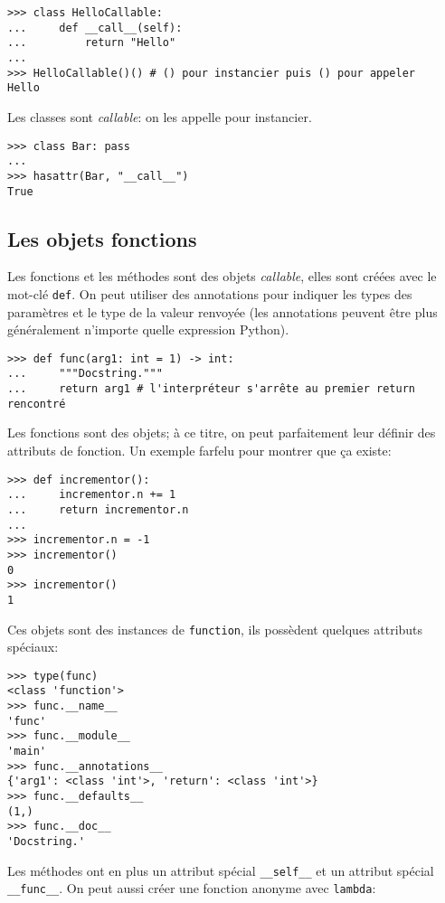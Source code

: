 \begin{verbatim}
>>> class HelloCallable:
...     def __call__(self):
...         return "Hello"
...
>>> HelloCallable()() # () pour instancier puis () pour appeler
Hello
\end{verbatim}


Les classes sont \emph{callable}: on les appelle pour instancier.
\begin{verbatim}
>>> class Bar: pass
...
>>> hasattr(Bar, "__call__")
True
\end{verbatim}

\subsection{Les objets fonctions}

Les fonctions et les méthodes sont des objets \textit{callable}, elles sont créées avec le mot-clé \texttt{def}. On peut utiliser des annotations pour indiquer les types des paramètres et le type de la valeur renvoyée (les annotations peuvent être plus généralement n'importe quelle expression Python).

\begin{verbatim}
>>> def func(arg1: int = 1) -> int:
...     """Docstring."""
...     return arg1 # l'interpréteur s'arrête au premier return rencontré
\end{verbatim}

Les fonctions sont des objets; à ce titre, on peut parfaitement leur définir des attributs de fonction. Un exemple farfelu
pour montrer que ça existe:

\begin{verbatim}
>>> def incrementor():
...     incrementor.n += 1
...     return incrementor.n
...
>>> incrementor.n = -1
>>> incrementor()
0
>>> incrementor()
1
\end{verbatim}

Ces objets sont des instances de \texttt{function}, ils possèdent quelques attributs spéciaux:

\begin{verbatim}
>>> type(func)
<class 'function'>
>>> func.__name__
'func'
>>> func.__module__
'main'
>>> func.__annotations__
{'arg1': <class 'int'>, 'return': <class 'int'>}
>>> func.__defaults__
(1,)
>>> func.__doc__
'Docstring.'
\end{verbatim}

Les méthodes ont en plus un attribut spécial \texttt{__self__} et un attribut spécial \texttt{__func__}. On peut aussi créer une fonction anonyme avec \texttt{lambda}:

